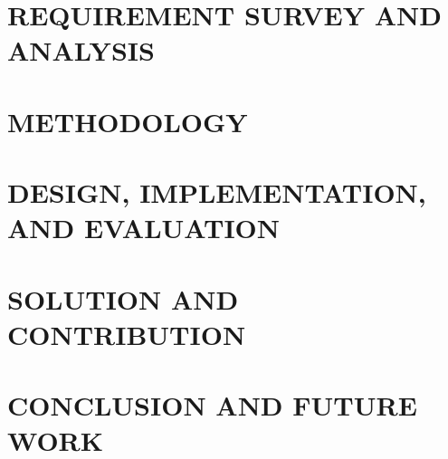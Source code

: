 \documentclass[a4paper,13pt,3p,twoside]{report}
\theoremstyle{definition}
\begin{document}
\chapter{REQUIREMENT SURVEY AND ANALYSIS}
\label{chapter:Related_works}


\newpage
\chapter{METHODOLOGY}
\label{chapter:Methodology}


\newpage
\chapter{DESIGN, IMPLEMENTATION, AND EVALUATION}
\label{chapter:Experiment}


\newpage
\chapter{SOLUTION AND CONTRIBUTION}
\label{chapter:SolutionAndContribution}


\newpage
\chapter{CONCLUSION AND FUTURE WORK}
\label{chapter:conclusion}


\newpage
\renewcommand\bibname{REFERENCE}


\end{document}
